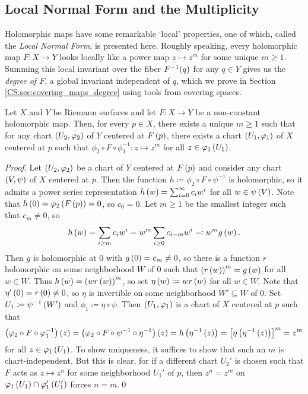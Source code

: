 \documentclass[../Moduli_Spaces_of_Riemann_Surfaces.tex]{subfiles}
\begin{document}
    \subsection{Local Normal Form and the Multiplicity}
    Holomorphic maps have some remarkable `local' properties, one of which, called the \textit{Local Normal Form}, is presented here. Roughly speaking, every holomorphic map $F:X\to Y$ looks locally like a power map $z\mapsto z^m$ for some unique $m\geq1$. Summing this local invariant over the fiber $F^{-1}\!\left(q\right)$ for any $q\in Y$ gives us the \textit{degree of $F$}, a global invariant independent of $q$, which we prove in Section \ref{CS:sec:covering_maps_degree} using tools from covering spaces.
    \begin{theorem}\label{RS:thm:local_normal_form}
        Let $X$ and $Y$ be Riemann surfaces and let $F:X\to Y$ be a non-constant holomorphic map. Then, for every $p\in X$, there exists a unique $m\geq1$ such that for any chart $\left(U_2,\varphi_2\right)$ of $Y$ centered at $F\left(p\right)$, there exists a chart $\left(U_1,\varphi_1\right)$ of $X$ centered at $p$ such that $\phi_2\circ F\circ\phi_1^{-1}:z\mapsto z^m$ for all $z\in\varphi_1\left(U_1\right)$.
    \end{theorem}
    \begin{proof}
        Let $\left(U_2,\varphi_2\right)$ be a chart of $Y$ centered at $F\left(p\right)$ and consider any chart $\left(V,\psi\right)$ of $X$ centered at $p$. Then the function $h\coloneqq\phi_2\circ F\circ\psi^{-1}$ is holomorphic, so it admits a power series representation $h\left(w\right)=\sum_{i=0}^{\infty}c_iw^i$ for all $w\in\psi\left(V\right)$. Note that $h\left(0\right)=\varphi_2\left(F\left(p\right)\right)=0$, so $c_0=0$. Let $m\geq1$ be the smallest integer such that $c_m\neq0$, so
        \begin{equation*}
            h\left(w\right)=\sum_{i\geq m}c_iw^i=w^m\sum_{i\geq0}c_{i-m}w^i\eqqcolon w^mg\left(w\right).
        \end{equation*}
        Then $g$ is holomorphic at $0$ with $g\left(0\right)=c_m\neq0$, so there is a function $r$ holomorphic on some neighborhood $W$ of $0$ such that $\left(r\left(w\right)\right)^m=g\left(w\right)$ for all $w\in W$. Thus $h\left(w\right)=\left(wr\left(w\right)\right)^m$, so set $\eta\left(w\right)\coloneqq wr\left(w\right)$ for all $w\in W$. Note that $\eta'\left(0\right)=r\left(0\right)\neq0$, so $\eta$ is invertible on some neighborhood $W'\subseteq W$ of $0$. Set $U_1\coloneqq\psi^{-1}\left(W'\right)$ and $\phi_1\coloneqq\eta\circ\psi$. Then $\left(U_1,\varphi_1\right)$ is a chart of $X$ centered at $p$ such that
        \begin{equation*}
            \left(\varphi_2\circ F\circ\varphi_1^{-1}\right)\left(z\right)=\left(\varphi_2\circ F\circ\psi^{-1}\circ\eta^{-1}\right)\left(z\right)=h\left(\eta^{-1}\left(z\right)\right)=\left[\eta\left(\eta^{-1}\left(z\right)\right)\right]^m=z^m
        \end{equation*}
        for all $z\in\varphi_1\left(U_1\right)$. To show uniqueness, it suffices to show that such an $m$ is chart-independent. But this is clear, for if a different chart $U_2'$ is chosen such that $F$ acts as $z\mapsto z^n$ for some neighborhood $U_1'$ of $p$, then $z^n=z^m$ on $\varphi_1\left(U_1\right)\cap\varphi_1'\left(U_1'\right)$ forces $n=m$.\qed
    \end{proof}
\end{document}
